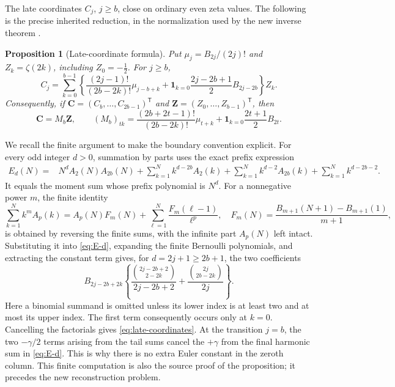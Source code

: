 \documentclass[11pt,letterpaper]{article}
\newtheorem{proposition}[theorem]{Proposition}
\theoremstyle{definition}
\theoremstyle{remark}
\numberwithin{equation}{section}
\begin{document}
The late coordinates $C_j$, $j\geq b$, close on ordinary even zeta
values. The following is the precise inherited reduction, in the
normalization used by the new inverse theorem
\cite[Sections 2--3]{incoming-bernoulli}.

\begin{proposition}[Late-coordinate formula]
\label{prop:late-coordinates}
Put $\mu_j=B_{2j}/(2j)!$ and $Z_k=\zeta(2k)$, including
$Z_0=-\tfrac12$. For $j\geq b$,
\begin{equation}\label{eq:late-coordinates}
 C_j=\sum_{k=0}^{b-1}
 \left\{\frac{(2j-1)!}{(2b-2k)!}\mu_{j-b+k}
 +\mathbf1_{k=0}\frac{2j-2b+1}{2}B_{2j-2b}\right\}Z_k.
\end{equation}
Consequently, if $\mathbf C=(C_b,\ldots,C_{2b-1})^{\mathsf T}$ and
$\mathbf Z=(Z_0,\ldots,Z_{b-1})^{\mathsf T}$, then
\begin{equation}\label{eq:M-system}
 \mathbf C=M_b\mathbf Z,
 \qquad
 (M_b)_{tk}=\frac{(2b+2t-1)!}{(2b-2k)!}\mu_{t+k}
       +\mathbf1_{k=0}\frac{2t+1}{2}B_{2t}.
\end{equation}
\end{proposition}

We recall the finite argument to make the boundary convention explicit.
For every odd integer $d>0$, summation by parts uses the exact prefix
expression
\begin{align}\label{eq:E-d}
 E_d(N)={}&N^dA_2(N)A_{2b}(N)
 +\sum_{k=1}^N k^{d-2b}A_2(k)
 +\sum_{k=1}^N k^{d-2}A_{2b}(k)
 +\sum_{k=1}^N k^{d-2b-2}.
\end{align}
It equals the moment sum whose prefix polynomial is $N^d$.
For a nonnegative power $m$, the finite identity
\begin{equation}\label{eq:faulhaber-tail}
 \sum_{k=1}^N k^m A_p(k)
 =A_p(N)F_m(N)+\sum_{\ell=1}^N\frac{F_m(\ell-1)}{\ell^p},
 \quad F_m(N)=\frac{B_{m+1}(N+1)-B_{m+1}(1)}{m+1},
\end{equation}
is obtained by reversing the finite sums, with the infinite part
$A_p(N)$ left intact. Substituting it into \eqref{eq:E-d}, expanding
the finite Bernoulli polynomials, and extracting the constant term
gives, for $d=2j+1\geq2b+1$, the two coefficients
\[
 B_{2j-2b+2k}
 \left\{
 \frac{\binom{2j-2b+2}{2-2k}}{2j-2b+2}
 +\frac{\binom{2j}{2b-2k}}{2j}\right\}.
\]
Here a binomial summand is omitted unless its lower index is at
least two and at most its upper index. The first term consequently
occurs only at $k=0$. Cancelling the factorials gives
\eqref{eq:late-coordinates}. At the transition $j=b$, the two
$-\gamma/2$ terms arising from the tail sums cancel the $+\gamma$
from the final harmonic sum in \eqref{eq:E-d}. This is why there is
no extra Euler constant in the zeroth column. This finite computation
is also the source proof of the proposition; it precedes the new
reconstruction problem.
\end{document}
